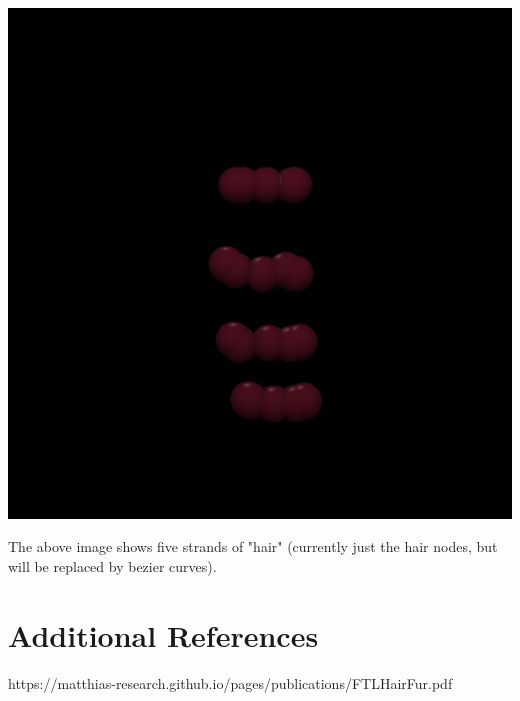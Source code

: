 \documentclass{article}
\begin{document}
\begin{center}
\includegraphics[scale=0.25]{check-in update}
\end{center}

The above image shows five strands of "hair" (currently just the hair nodes, but will be replaced by bezier curves).

\section{Additional References}
https://matthias-research.github.io/pages/publications/FTLHairFur.pdf
\end{document}
